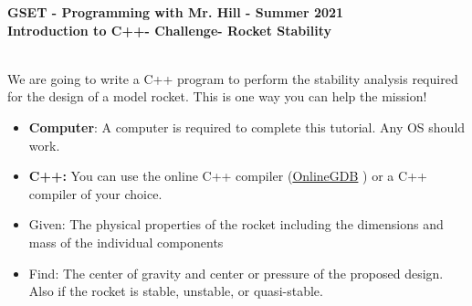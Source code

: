 \documentclass[12pt]{article}
\newcommand{\MNUM}{6} %
\newcommand{\MNAME}{Introduction to C++} %
\newcommand{\TNAME}{Rocket Stability} %
\begin{document}
\thispagestyle{plain}

\begin{center}
   {\bf \large GSET - Programming with Mr. Hill - Summer 2021} \vspace{5mm}\\
   {\bf \Large \MNAME \hspc -  Challenge\hspc\MNUM\hspc - \TNAME}\vspace{3mm}\\
   
\end{center}


\begin{description}[labelindent=1cm]
	
	\item[\textbf{\underline{Overview:}}] \hfill \vspace{3mm}\\
	We are going to write a C++ program to perform the stability analysis required for the design of a model rocket. This is one way you can help the mission!
	
	\item[\textbf{\underline{System Requirements:}}] \hfill \vspace{0mm}

\begin{itemize}
	\item {\bf Computer}: A computer is required to complete this tutorial. Any OS should work.
	\item {\bf C++:} You can use the online C++ compiler (\href{https://www.onlinegdb.com/online\_c++\_compiler}{OnlineGDB} ) or a C++ compiler of your choice.
\end{itemize}

	\item[\textbf{\underline{Problem Statement:}}] \hfill \vspace{0mm}
	
	\begin{itemize}

		\item Given: The physical properties of the rocket including the dimensions and mass of the individual components 
		
		\item Find: The center of gravity and center or pressure of the proposed design. Also if the rocket is stable, unstable, or quasi-stable.  
		 
	\end{itemize}


\end{description}
\end{document}
